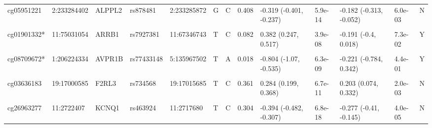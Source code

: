 \documentclass[11pt,oneside]{bristolthesis}
\begin{document}
\begin{landscape}
\begin{table}[!h]
{\begin{tabular}[t]{lllllllllllll}
\addlinespace
cg05951221 & 2:233284402 & ALPPL2 & rs878481 & 2:233285872 & G & C & 0.408 & -0.319 (-0.401, -0.237) & 5.9e-14 & -0.182 (-0.313, -0.052) & 6.0e-03 & N\\
\cellcolor{gray!6}{cg21566642*} & \cellcolor{gray!6}{2:233284661} & \cellcolor{gray!6}{ALPPL2} & \cellcolor{gray!6}{rs3748971} & \cellcolor{gray!6}{2:233250683} & \cellcolor{gray!6}{T} & \cellcolor{gray!6}{C} & \cellcolor{gray!6}{0.074} & \cellcolor{gray!6}{-0.593 (-0.743, -0.443)} & \cellcolor{gray!6}{2.7e-14} & \cellcolor{gray!6}{0.111 (-0.115, 0.338)} & \cellcolor{gray!6}{3.4e-01} & \cellcolor{gray!6}{N}\\
cg01901332* & 11:75031054 & ARRB1 & rs7927381 & 11:67346743 & T & C & 0.082 & 0.382 (0.247, 0.517) & 3.9e-08 & -0.191 (-0.4, 0.018) & 7.3e-02 & Y\\
\cellcolor{gray!6}{cg01901332*} & \cellcolor{gray!6}{11:75031054} & \cellcolor{gray!6}{ARRB1} & \cellcolor{gray!6}{rs13087163} & \cellcolor{gray!6}{3:77329538} & \cellcolor{gray!6}{A} & \cellcolor{gray!6}{C} & \cellcolor{gray!6}{0.390} & \cellcolor{gray!6}{-0.194 (-0.263, -0.124)} & \cellcolor{gray!6}{5.8e-08} & \cellcolor{gray!6}{0.11 (-0.019, 0.239)} & \cellcolor{gray!6}{9.4e-02} & \cellcolor{gray!6}{Y}\\
cg08709672* & 1:206224334 & AVPR1B & rs77433148 & 5:135967502 & T & A & 0.018 & -0.804 (-1.07, -0.535) & 6.3e-09 & -0.221 (-0.784, 0.342) & 4.4e-01 & Y\\
\addlinespace
\cellcolor{gray!6}{cg25305703} & \cellcolor{gray!6}{8:128378218} & \cellcolor{gray!6}{CASC21} & \cellcolor{gray!6}{rs9643220} & \cellcolor{gray!6}{8:128386926} & \cellcolor{gray!6}{A} & \cellcolor{gray!6}{G} & \cellcolor{gray!6}{0.227} & \cellcolor{gray!6}{0.343 (0.247, 0.440)} & \cellcolor{gray!6}{7.1e-12} & \cellcolor{gray!6}{0.232 (0.078, 0.385)} & \cellcolor{gray!6}{3.0e-03} & \cellcolor{gray!6}{N}\\
cg03636183 & 19:17000585 & F2RL3 & rs734568 & 19:17015685 & T & C & 0.361 & 0.284 (0.199, 0.368) & 6.7e-11 & 0.203 (0.074, 0.332) & 2.0e-03 & N\\
\cellcolor{gray!6}{cg09935388} & \cellcolor{gray!6}{1:92947588} & \cellcolor{gray!6}{GFI1} & \cellcolor{gray!6}{rs17518433} & \cellcolor{gray!6}{1:92599172} & \cellcolor{gray!6}{A} & \cellcolor{gray!6}{T} & \cellcolor{gray!6}{0.236} & \cellcolor{gray!6}{-0.330 (-0.421, -0.240)} & \cellcolor{gray!6}{1.8e-12} & \cellcolor{gray!6}{-0.186 (-0.339, -0.033)} & \cellcolor{gray!6}{1.7e-02} & \cellcolor{gray!6}{N}\\
cg26963277 & 11:2722407 & KCNQ1 & rs463924 & 11:2717680 & T & C & 0.304 & -0.394 (-0.482, -0.307) & 6.8e-18 & -0.277 (-0.41, -0.145) & 4.0e-05 & N\\

\end{tabular}}
\end{table}
\end{landscape}
\end{document}
